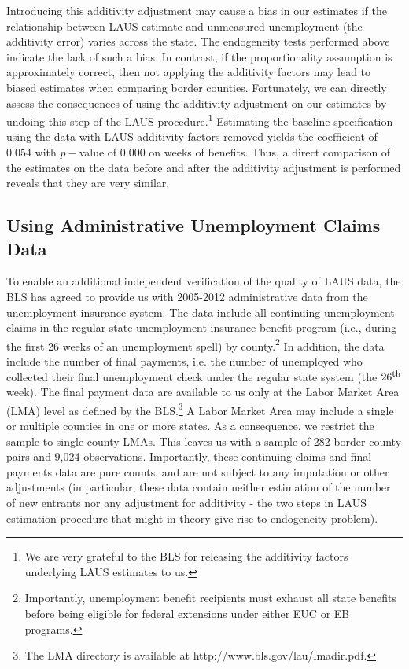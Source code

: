 \documentclass[12pt]{article}
\newcommand{\1}{\mathbf{1}}
\begin{document}
\begin{appendix}
Introducing this additivity adjustment may cause a bias in our estimates if the relationship between LAUS estimate and unmeasured unemployment (the additivity error) varies across the state. The endogeneity tests performed above indicate the lack of such a bias. In contrast, if the proportionality assumption is approximately correct, then not applying the additivity factors may lead to biased estimates when comparing border counties. Fortunately, we can directly assess the consequences of using the additivity adjustment on our estimates by undoing this step of the LAUS procedure.\footnote{We are very grateful to the BLS for releasing the additivity factors underlying LAUS estimates to us.} Estimating the baseline specification using the data with LAUS additivity factors removed yields the coefficient of $0.054$ with $p-$value of $0.000$ on weeks of benefits. Thus, a direct comparison of the estimates on the data before and after the additivity adjustment is performed reveals that they are very similar.




\subsection{Using Administrative Unemployment Claims Data}
\label{app:data_quality_claims}
To enable an additional independent verification of the quality of LAUS data, the BLS has agreed to provide us with 2005-2012 administrative data from the unemployment insurance system. The data include all continuing unemployment claims in the regular state unemployment insurance benefit program (i.e., during the first 26 weeks of an unemployment spell) by county.\footnote{Importantly, unemployment benefit recipients must exhaust all state benefits before being eligible for federal extensions under either EUC or EB programs.} In addition, the data include the number of final payments, i.e. the number of unemployed who collected their final unemployment check under the regular state system (the $26^{\mbox{\footnotesize th}}$ week). The final payment data are available to us only at the Labor Market Area (LMA) level as defined by the BLS.\footnote{The LMA directory is available at http://www.bls.gov/lau/lmadir.pdf.} A Labor Market Area may include a single or multiple counties in one or more states. As a consequence, we restrict the sample to single county LMAs. This leaves us with a sample of 282 border county pairs and 9,024 observations. Importantly, these continuing claims and final payments data are pure counts, and are not subject to any imputation or other adjustments (in particular, these data contain neither estimation of the number of new entrants nor any adjustment for additivity - the two steps in LAUS estimation procedure that might in theory give rise to endogeneity problem).




\end{appendix}
\end{document}
